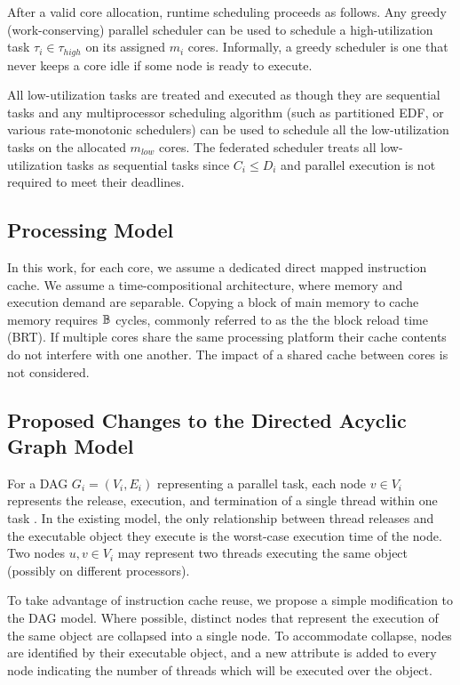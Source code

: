 After a valid core allocation, runtime scheduling proceeds as
follows. Any greedy (work-conserving) parallel scheduler can be used
to schedule a high-utilization task $\tau_{i} \in \tau_{high}$ on its
assigned $m_{i}$ cores. Informally, a greedy scheduler is one that never
keeps a core idle if some node is ready to execute. 

All low-utilization tasks are treated and executed as though they are
sequential tasks and any multiprocessor scheduling algorithm (such as
partitioned EDF, or various rate-monotonic schedulers) can be used to
schedule all the low-utilization tasks on the allocated $m_{low}$
cores. The federated scheduler treats all low-utilization tasks as sequential tasks
since $C_{i} \le D_{i}$ and parallel execution is not required to meet their
deadlines. 

\subsection{Processing Model}

In this work, for each core, we assume a dedicated direct mapped
instruction cache. We assume a time-compositional architecture\addcite,
where memory and execution demand are separable. Copying a block of 
main memory to cache memory requires $\mathbb{B}$ cycles, commonly
referred to as the the block reload time (BRT). If multiple cores share
the same processing platform their cache contents do not interfere with
one another. The impact of a shared cache between cores is not considered.


\subsection{Proposed Changes to the Directed Acyclic Graph Model}
For a DAG ${G_i = (V_i, E_i)}$ representing a parallel task, each node ${v \in V_i}$ represents
the release, execution, and termination of a single thread within one task 
\cite{li2014analysis}. In the existing model, the only relationship between thread releases and the executable object they execute is the worst-case execution time of the node. Two nodes ${u, v \in V_i}$ may represent two threads executing the same object (possibly on different processors).

To take advantage of instruction cache reuse, we propose a simple modification to the DAG
model. Where possible, distinct nodes that represent the execution of
the same object are collapsed into a single node. To accommodate collapse,
nodes are identified by their executable object, and a new attribute is added to every node
indicating the number of threads which will be executed over the object.

